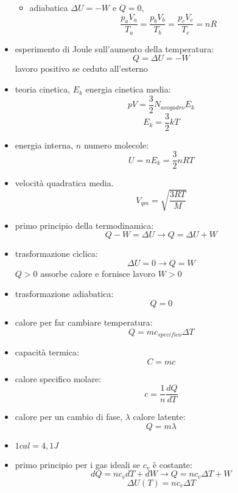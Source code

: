 \documentclass[a4paper,12pt, oneside]{book}
\begin{document}
\begin{itemize}
\begin{itemize}
		      \item adiabatica $\Delta U=-W$ e $Q=0$, $$\frac{p_aV_a}{T_a}=\frac{p_bV_b}{T_b}=\frac{p_cV_c}{T_c}=nR$$
	      \end{itemize}
	\item esperimento di Joule sull'aumento della temperatura:
	      $$Q=\Delta U=-W$$
	      lavoro positivo se ceduto all'esterno
	\item teoria cinetica, $E_k$ energia cinetica media:
	      $$pV=\frac{3}{2}N_{avogadro}E_k$$
	      $$E_k=\frac{3}{2}kT$$
	\item energia interna, $n$ numero molecole:
	      $$U=nE_k=\frac{3}{2}nRT$$
	\item velocità quadratica media.
	      $$V_{qm}=\sqrt{\frac{3RT}{M}}$$
	\item primo principio della termodinamica:
	      $$Q-W=\Delta U\to Q=\Delta U+W$$
	\item trasformazione ciclica:
	      $$\Delta U=0\to Q=W$$
	      $Q>0$ assorbe calore e fornisce lavoro $W>0$
	\item trasformazione adiabatica:
	      $$Q=0$$
	\item calore per far cambiare temperatura:
	      $$Q=mc_{specifico}\Delta T$$
	\item capacità termica:
	      $$C=mc$$
	\item calore specifico molare:
	      $$c=\frac{1}{n}\frac{dQ}{dT}$$
	\item calore per un cambio di fase, $\lambda$ calore latente:
	      $$Q=m\lambda$$
	\item $1 cal=4,1J$
	\item primo principio per i gas ideali se $c_v$ è costante:
	      $$dQ=nc_vdT+dW\longrightarrow Q=nc_v\Delta T+W$$
	      $$\Delta U(T)=nc_v\Delta T$$
\end{itemize}
\end{document}
